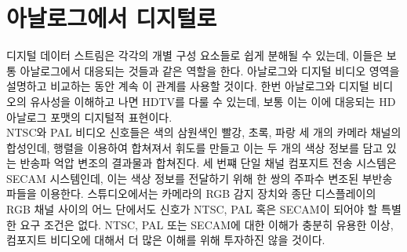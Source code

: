 \chapter{아날로그에서 디지털로}

디지털 데이터 스트림은 각각의 개별 구성 요소들로 쉽게 분해될 수 있는데, 이들은 보통 아날로그에서 대응되는 것들과 같은 역할을 한다.
아날로그와 디지털 비디오 영역을 설명하고 비교하는 동안 계속 이 관계를 사용할 것이다.
한번 아날로그와 디지털 비디오의 유사성을 이해하고 나면 HDTV를 다룰 수 있는데, 보통 이는 이에 대응되는 HD 아날로그 포맷의 디지털적 표현이다.
\\
NTSC와 PAL 비디오 신호들은 색의 삼원색인 빨강, 초록, 파랑 세 개의 카메라 채널의 합성인데, 행렬을 이용하여 합쳐져서 휘도를 만들고 이는 두 개의 색상 정보를 담고 있는 반송파 억압 변조의 결과물과 합쳐진다.
세 번쨰 단일 채널 컴포지트 전송 시스템은 SECAM 시스템인데, 이는 색상 정보를 전달하기 위해 한 쌍의 주파수 변조된 부반송파들을 이용한다.
스튜디오에서는 카메라의 RGB 감지 장치와 종단 디스플레이의 RGB 채널 사이의 어느 단에서도 신호가 NTSC, PAL 혹은 SECAM이 되어야 할 특별한 요구 조건은 없다.
NTSC, PAL 또는 SECAM에 대한 이해가 충분히 유용한 이상, 컴포지트 비디오에 대해서 더 많은 이해를 위해 투자하진 않을 것이다.

